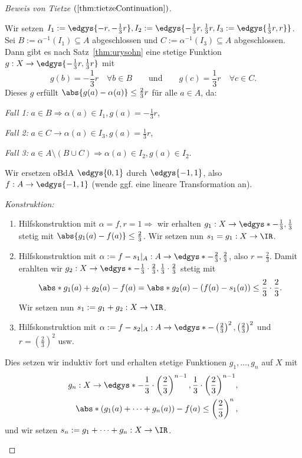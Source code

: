 \documentclass[language=ngerman]{TemplateLecture} %
\begin{document}
\begin{proof}[Beweis von Tietze $(\ref{thm:tietzeContinuation})$]
\begin{enumerate}[$(i)$]
        Wir setzen $I_1 := \edgys{-r, -\frac{1}{3}r}, I_2 := \edgys{-\frac{1}{3}r, \frac{1}{3}r, I_3 := \edgys{\frac{1}{3}r, r}}$. Sei $B := \alpha^{-1}(I_1) \subseteq A$ abgeschlossen und $C := \alpha^{-1}(I_3) \subseteq A$ abgeschlossen. Dann gibt es nach Satz~\ref{thm:urysohn} eine stetige Funktion $g: X \to \edgys{-\frac{1}{3}r, \frac{1}{3}r}$ mit 
        \begin{equation*}
            g(b) = -\frac{1}{3} r \quad \forall b \in B \quad \quad \text{und} \quad \quad g(c) = \frac{1}{3}r \quad \forall c \in C.
        \end{equation*}
        Dieses $g$ erfüllt $\abs{g(a) - \alpha(a)} \leq \frac{2}{3}r$ für alle $a \in A$, da:
        
        \emph{Fall 1:} $a \in B \Rightarrow \alpha(a) \in I_1, g(a) = -\frac{1}{3}r$,

        \emph{Fall 2:} $a \in C \rightarrow \alpha(a) \in I_3, g(a) = \frac{1}{3}r$,

        \emph{Fall 3:} $a \in A \setminus (B \cup C) \Rightarrow \alpha(a) \in I_2, g(a) \in I_2$.

        Wir ersetzen oBdA $\edgys{0,1}$ durch $\edgys{-1,1}$, also $f: A \to \edgys{-1,1}$ (wende ggf. eine lineare Transformation an).

        \emph{Konstruktion:}
        \begin{enumerate}[1.]
            \item Hilfskonstruktion mit $\alpha = f, r = 1 \Rightarrow$ wir erhalten $g_1: X \to \edgys*{-\frac{1}{3}, \frac{1}{3}}$ stetig mit $\abs{g_1(a) - f(a)} \leq \frac{2}{3}$. Wir setzen nun $s_1 = g_1: X \to \IR$.
            \item Hilfskonstruktion mit $\alpha := f - s_1|_A: A \to \edgys*{-\frac{2}{3}, \frac{2}{3}}$, also $r = \frac{2}{3}$. Damit erahlten wir $g_2: X \to \edgys*{-\frac{1}{3} \cdot \frac{2}{3}, \frac{1}{3} \cdot \frac{2}{3}}$ stetig mit 
            \begin{equation*}
                \abs*{g_1(a) + g_2(a) - f(a)} = \abs*{g_2(a) - (f(a) - s_1(a))} \leq \frac{2}{3} \cdot \frac{2}{3}.
            \end{equation*}
            Wir setzen nun $s_1 := g_1 + g_2: X \to \IR$.
            \item Hilfskonstruktion mit $\alpha := f - s_2|_A : A \to \edgys*{-\left(\frac{2}{3}\right)^2, \left(\frac{2}{3}\right)^2}$ und $r = \left(\frac{2}{3}\right)^2$ usw.
        \end{enumerate}
        Dies setzen wir induktiv fort und erhalten stetige Funktionen $g_1, \ldots, g_n$ auf $X$ mit 
        \begin{align*}
            g_n: X \to \edgys*{-\frac{1}{3} \cdot \left(\frac{2}{3}\right)^{n-1}, \frac{1}{3} \cdot \left(\frac{2}{3}\right)^{n-1}}, \\
            \abs*{(g_1(a) + \cdots + g_n(a)) - f(a)} \leq \left(\frac{2}{3}\right)^n,
        \end{align*}
        und wir setzen $s_n := g_1 + \cdots + g_n: X \to \IR$.


\end{enumerate}
\end{proof}
\end{document}
